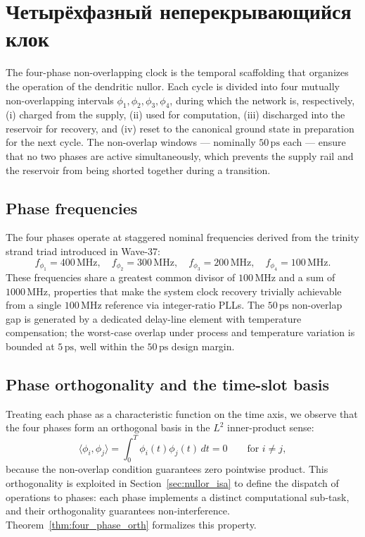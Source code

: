 \section{Четырёхфазный неперекрывающийся клок}
\label{sec:four_phase}

The four-phase non-overlapping clock is the temporal scaffolding that organizes the
operation of the dendritic nullor.  Each cycle is divided into four mutually
non-overlapping intervals $\phi_1, \phi_2, \phi_3, \phi_4$, during which the
network is, respectively, (i) charged from the supply, (ii) used for computation,
(iii) discharged into the reservoir for recovery, and (iv) reset to the canonical
ground state in preparation for the next cycle.  The non-overlap windows --- nominally
$50\,\text{ps}$ each --- ensure that no two phases are active simultaneously, which
prevents the supply rail and the reservoir from being shorted together during a
transition.

\subsection{Phase frequencies}
\label{subsec:phase_freq}

The four phases operate at staggered nominal frequencies derived from the trinity
strand triad introduced in Wave-37:
\[
  f_{\phi_1} = 400\,\text{MHz},\quad f_{\phi_2} = 300\,\text{MHz},\quad
  f_{\phi_3} = 200\,\text{MHz},\quad f_{\phi_4} = 100\,\text{MHz}.
\]
These frequencies share a greatest common divisor of $100\,\text{MHz}$ and a sum
of $1000\,\text{MHz}$, properties that make the system clock recovery trivially
achievable from a single $100\,\text{MHz}$ reference via integer-ratio PLLs.  The
$50\,\text{ps}$ non-overlap gap is generated by a dedicated delay-line element with
temperature compensation; the worst-case overlap under process and temperature
variation is bounded at $5\,\text{ps}$, well within the $50\,\text{ps}$ design
margin.

\subsection{Phase orthogonality and the time-slot basis}
\label{subsec:phase_orth}

Treating each phase as a characteristic function on the time axis, we observe that
the four phases form an orthogonal basis in the $L^2$ inner-product sense:
\[
  \langle \phi_i, \phi_j \rangle = \int_0^T \phi_i(t) \phi_j(t) \, dt = 0
  \qquad \text{for } i \neq j,
\]
because the non-overlap condition guarantees zero pointwise product.  This
orthogonality is exploited in Section~\ref{sec:nullor_isa} to define the dispatch of
operations to phases: each phase implements a distinct computational sub-task, and
their orthogonality guarantees non-interference.  Theorem~\ref{thm:four_phase_orth}
formalizes this property.

